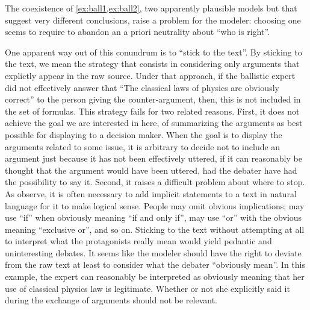 \documentclass[version=3.21, pagesize, twoside=off, bibliography=totoc, DIV=calc, fontsize=12pt, a4paper, french, english]{scrartcl}
\begin{document}
The coexistence of \cref{ex:ball1,ex:ball2}, two apparently plausible models but that suggest very different conclusions, raise a problem for the modeler: choosing one seems to require to abandon an a priori neutrality about “who is right”. 

One apparent way out of this conundrum is to “stick to the text”. By sticking to the text, we mean the strategy that consists in considering only arguments that explictly appear in the raw source. Under that approach, if the ballistic expert did not effectively answer that “The classical laws of physics are obviously correct” to the person giving the counter-argument, then, this is not included in the set of formulas. This strategy fails for two related reasons. First, it does not achieve the goal we are interested in here, of summarizing the arguments as best possible for displaying to a decision maker. When the goal is to display the arguments related to some issue, it is arbitrary to decide not to include an argument just because it has not been effectively uttered, if it can reasonably be thought that the argument would have been uttered, had the debater have had the possibility to say it. Second, it raises a difficult problem about where to stop. As \citeauthor{besnard_elements_2000} observe, it is often necessary to add implicit statements to a text in natural language for it to make logical sense. People may omit obvious implications; may use “if” when obviously meaning “if and only if”, may use “or” with the obvious meaning “exclusive or”, and so on. Sticking to the text without attempting at all to interpret what the protagonists really mean would yield pedantic and uninteresting debates. It seems like the modeler should have the right to deviate from the raw text at least to consider what the debater “obviously mean”. In this example, the expert can reasonably be interpreted as obviously meaning that her use of classical physics law is legitimate. Whether or not she explicitly said it during the exchange of arguments should not be relevant.
\end{document}
